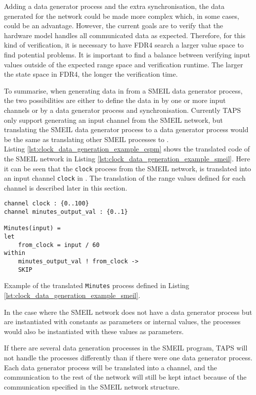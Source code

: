 Adding a data generator process and the extra synchronisation, the data generated for the network could be made more complex which, in some cases, could be an advantage. However, the current goals are to verify that the hardware model handles all communicated data as expected. Therefore, for this kind of verification, it is necessary to have FDR4 search a larger value space to find potential problems. It is important to find a balance between verifying input values outside of the expected range space and verification runtime. The larger the state space in FDR4, the longer the verification time.

To summarise, when generating data in \cspm{} from a SMEIL data generator process, the two possibilities are either to define the data in \cspm by one or more input channels or by a data generator process and synchronisation.
Currently TAPS only support generating an input channel from the SMEIL network, but translating the SMEIL data generator process to a \cspm{} data generator process would be the same as translating other SMEIL processes to \cspm{}.\\

Listing \ref{lst:clock_data_generation_example_cspm} shows the translated code of the SMEIL network in Listing \ref{lst:clock_data_generation_example_smeil}. Here it can be seen that the \texttt{clock} process from the SMEIL network, is translated into an input channel \texttt{clock} in \cspm{}. The translation of the range values defined for each channel is described later in this section.
\begin{listing}
\begin{verbatim}
channel clock : {0..100}
channel minutes_output_val : {0..1}

Minutes(input) =
let
    from_clock = input / 60
within
    minutes_output_val ! from_clock ->
    SKIP

\end{verbatim}
\caption{Example of the translated \texttt{Minutes} process defined in Listing \ref{lst:clock_data_generation_example_smeil}.}
\label{lst:clock_data_generation_example_cspm}
\end{listing}
In the case where the SMEIL network does not have a data generator process but are instantiated with constants as parameters or internal values, the \cspm{} processes would also be instantiated with these values as parameters.

If there are several data generation processes in the SMEIL program, TAPS will not handle the processes differently than if there were one data generator process. Each data generator process will be translated into a \cspm channel, and the communication to the rest of the network will still be kept intact because of the communication specified in the SMEIL network structure.


